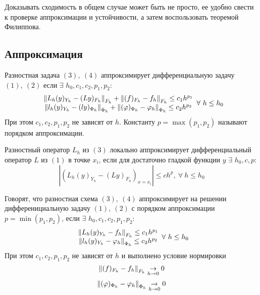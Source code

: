 Доказывать сходимость в общем случае может быть не просто, ее удобно свести
к проверке аппроксимации и устойчивости, а затем воспользовать теоремой Филиппова.

\subsection*{Аппроксимация}

\begin{definition}
  Разностная задача $(3),\ (4)$ аппроксимирует дифференциальную задачу $(1),\ (2)$
  если $\exists$ $h_0,c_1,c_2,p_1,p_2$:
  \[\begin{array}{c}
      \left\lVert L_h(y)_{Y_h} - (Ly)_{F_h}\right\rVert_{F_h}+\left\lVert(f)_{F_h}-f_h\right\rVert_{F_h}\leq c_1h^{p_1} \\
      \left\lVert l_h(y)_{Y_h} - (ly)_{\Phi_h}\right\rVert_{\Phi_h}+\left\lVert(\varphi)_{\Phi_h}-\varphi_h\right\rVert_{\Phi_h}\leq c_2h^{p_2}
    \end{array}\forall\ h\leq h_0\]
  При этом $c_1,c_2,p_1,p_2$ не зависят от $h$. Константу $p=\max(p_1,p_2)$ называют
  порядком аппроксимации.
\end{definition}

\begin{definition}
  Разностный оператор $L_h$ из $(3)$ локально аппроксимирует дифференциальный
  оператор $L$ из $(1)$ в точке $x_i$, если для достаточно
  гладкой функции $y$ $\exists$ $h_0,c,p$:
  \[|(L_h(y)_{Y_h} - (Ly)_{F_h})_{x=x_i}|\leq ch^p,\ \forall\ h\leq h_0\]
\end{definition}

\begin{definition}
  Говорят, что разностная схема $(3),\ (4)$ аппроксимирует на решении
  дифференициальную задачу $(1),\ (2)$ с порядком аппроксимации $p=\min(p_1,p_2)$,
  если $\exists$ $h_0,c_1,c_2,p_1,p_2$:
  \[\begin{array}{c}
      \left\lVert L_h(y)_{Y_h}-f_h\right\rVert_{F_h}\leq c_1h^{p_1} \\
      \left\lVert l_h(y)_{Y_h}-\varphi_h\right\rVert_{\Phi_h}\leq c_2h^{p_2}
    \end{array}\forall\ h\leq h_0\]
  При этом $c_1,c_2,p_1,p_2$ не зависят от $h$ и выполнено условие нормировки
  \[\left\lVert(f)_{F_h}-f_h\right\rVert_{F_h}\underset{h\rightarrow0}{\rightarrow}0\]
  \[\left\lVert(\varphi)_{\Phi_h}-\varphi_h\right\rVert_{\Phi_h}\underset{h\rightarrow0}{\rightarrow}0\]
\end{definition}

